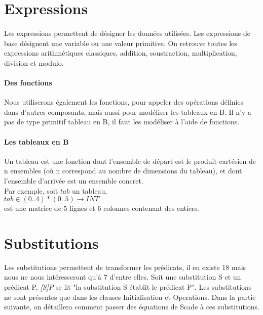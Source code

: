 
\section{Expressions}

\paragraph{}
Les expressions permettent de désigner les données utilisées. Les
expressions de base désignent une variable ou une valeur primitive.
On retrouve toutes les expressions arithmétiques classiques, addition,
soustraction, multiplication, division et modulo.

\paragraph{Des fonctions}

Nous utiliserons également les fonctions, pour appeler des opérations
définies dans d'autres composants, mais aussi pour modéliser les
tableaux en B. Il n'y a pas de type primitif tableau en B, il faut les
modéliser à l'aide de fonctions.

\paragraph{Les tableaux en B}
Un tableau est une fonction dont l'ensemble de départ est le produit
cartésien de n ensembles (où n correspond au nombre de dimensions du
tableau), et dont l'ensemble d'arrivée est un ensemble concret.\\
Par exemple, soit $tab$ un tableau, \\
$tab \in (0..4)*(0..5) \rightarrow INT$ \\
est une matrice de 5 lignes et 6 colonnes contenant des entiers.



\section{Substitutions}
Les substitutions permettent de transformer les prédicats, il en existe 18 mais
nous ne nous intéresseront qu'à 7 d'entre elles. Soit une substitution S et un
prédicat P, \emph{[S]P} se lit "la substitution S établit le prédicat P".
Les substitutions ne sont présentes que dans les clauses Initialisation et
Operations. Dans la partie suivante, on détaillera comment passer des équations
de Scade à ces substitutions.

